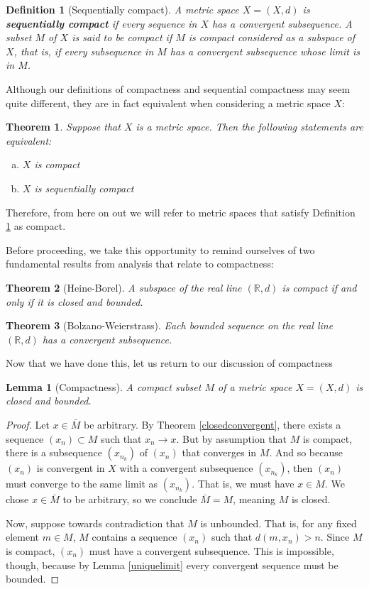 \documentclass[11pt]{article}
\theoremstyle{mystyle}
\newtheorem{thm}{Theorem}[section]
\newtheorem{lm}{Lemma}[section]
\newtheorem{defn}{Definition}[section]
\newcommand{\0}{\mathbf{0}}
\begin{document}
\begin{defn}[Sequentially compact]\label{sequentiallycompact}
A metric space $X = (X, d)$ is \textbf{sequentially compact} if every sequence in $X$ has a convergent subsequence. A subset $M$ of $X$ is said to be compact if $M$ is compact considered as a subspace of $X$, that is, if every subsequence in $M$ has a convergent subsequence whose limit is in $M$.
\end{defn}

Although our definitions of compactness and sequential compactness may seem quite different, they are in fact equivalent when considering a metric space $X$:
\begin{thm}
Suppose that $X$ is a metric space. Then the following statements are equivalent:
\begin{enumerate}[(a)]
    \item $X$ is compact
    \item $X$ is sequentially compact
\end{enumerate}
\end{thm}
Therefore, from here on out we will refer to metric spaces that satisfy Definition \ref{sequentiallycompact} as compact.

Before proceeding, we take this opportunity to remind ourselves of two fundamental results from analysis that relate to compactness:
\begin{thm}[Heine-Borel]\label{heine-borel}
A subspace of the real line $(\mathbb{R}, d)$ is compact if and only if it is closed and bounded.
\end{thm}

\begin{thm}[Bolzano-Weierstrass]\label{bolzano-weierstrass}
Each bounded sequence on the real line $(\mathbb{R}, d)$ has a convergent subsequence.
\end{thm}

Now that we have done this, let us return to our discussion of compactness
\begin{lm}[Compactness]\label{compactclosedbounded}
A compact subset $M$ of a metric space $X = (X, d)$ is closed and bounded.
\end{lm}
\begin{proof}
Let $x \in \bar{M}$ be arbitrary. By Theorem \ref{closedconvergent}, there exists a sequence $(x_n) \subset M$ such that $x_n \longrightarrow x$. But by assumption that $M$ is compact, there is a subsequence $(x_{n_k})$ of $(x_n)$ that converges in $M$. And so because $(x_n)$ is convergent in $X$ with a convergent subsequence $(x_{n_k})$, then $(x_n)$ must converge to the same limit as $(x_{n_k})$. That is, we must have $x \in M$. We chose $x \in \bar{M}$ to be arbitrary, so we conclude $\bar{M} = M$, meaning $M$ is closed.

Now, suppose towards contradiction that $M$ is unbounded. That is, for any fixed element $m \in M$, $M$ contains a sequence $(x_n)$ such that $d(m, x_n) > n$. Since $M$ is compact, $(x_n)$ must have a convergent subsequence. This is impossible, though, because by Lemma \ref{uniquelimit} every convergent sequence must be bounded.
\end{proof}
\end{document}
